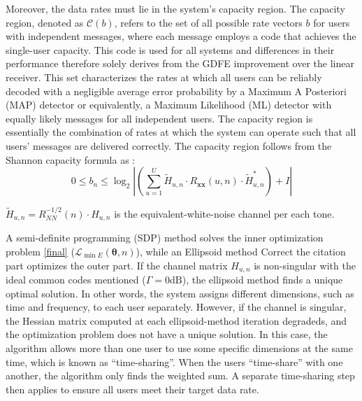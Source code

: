 Moreover, the data rates must lie in the system's capacity region. The capacity region, denoted as $\mathcal{C}(b)$, refers to the set of all possible rate vectors $b$ for users with independent messages, where each message employs a code that achieves the single-user capacity. This code is used for all systems and differences in their performance therefore solely derives from the GDFE improvement over the linear receiver.  This set characterizes the rates at which all users can be reliably decoded with a negligible average error probability by a Maximum A Posteriori (MAP) detector or equivalently, a Maximum Likelihood (ML) detector with equally likely messages for all independent users. The capacity region is essentially the combination of rates at which the system can operate such that all users' messages are delivered correctly. %
The capacity region follows from the Shannon capacity formula as \cite{shannon}: 
\begin{equation}
0 \leq b_n %
\leq \log _2\left|\left(\sum_{u=1}^U \widetilde{H}_{u, n} \cdot R_{\boldsymbol{x} \boldsymbol{x}}(u, n) \cdot \widetilde{H}_{u, n}^*\right)+I\right|
\end{equation}

$\tilde{H}_{u, n}=R_{N N}^{-1 / 2}(n) \cdot H_{u, n}$ is the equivalent-white-noise channel per each tone.

A semi-definite programming (SDP) method solves the inner optimization problem \ref{final} ($\mathcal{L}_{\min E}(\boldsymbol{\theta}, n)$), while an Ellipsoid method \cite{yudin1976constrained} {\color{red} Correct the citation part} optimizes the outer part. 
If the channel matrix $H_{u,n}$ is non-singular with the ideal common codes mentioned ($\Gamma = 0 \textrm{dB}$), the ellipsoid method finds a unique optimal solution. In other words, the system assigns different dimensions, such as time and frequency, to each user separately. However, if the channel is singular, the Hessian matrix computed at each ellipsoid-method iteration degradeds, and the optimization problem does not have a unique solution. In this case, the algorithm allows more than one user to use some specific dimensions at the same time, which is known as “time-sharing”. When the users “time-share” with one another, the algorithm only finds the weighted sum.  A separate time-sharing step then applies to ensure all users meet their target data rate.  

